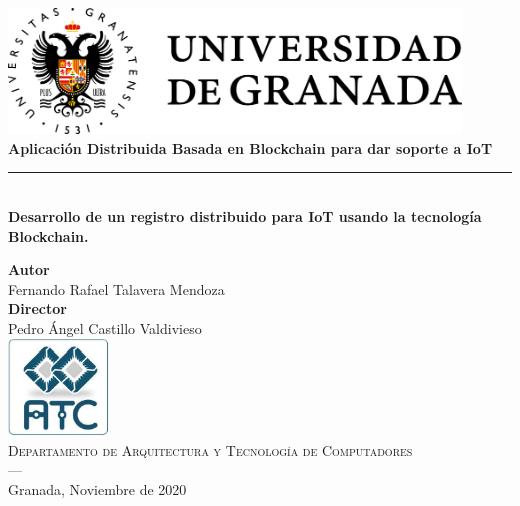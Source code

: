\begin{titlepage}

\setlength{\centeroffset}{-0.5\oddsidemargin}
\addtolength{\centeroffset}{0.5\evensidemargin}

\noindent\hspace*{\centeroffset}\begin{minipage}{\textwidth}

\centering

\includegraphics[width=0.9\textwidth]{imagenes/logo_ugr}\\[1.4cm]


{\Huge\bfseries Aplicación Distribuida Basada en Blockchain para dar soporte a IoT\\
}
\noindent\rule[-1ex]{\textwidth}{3pt}\\[3.5ex]
{\large\bfseries Desarrollo de un registro distribuido para IoT usando la tecnología Blockchain.\\[4cm]}
\end{minipage}

\vspace{2.5cm}
\noindent\hspace*{\centeroffset}\begin{minipage}{\textwidth}
\centering

\textbf{Autor}\\ {Fernando Rafael Talavera Mendoza}\\[2.5ex]
\textbf{Director}\\
{Pedro Ángel Castillo Valdivieso}\\[2cm]

\includegraphics[width=0.2\textwidth]{imagenes/atc}\\[0.1cm]
\textsc{Departamento de Arquitectura y Tecnología de Computadores}\\
\textsc{---}\\
Granada, Noviembre de 2020
\end{minipage}
\end{titlepage}


